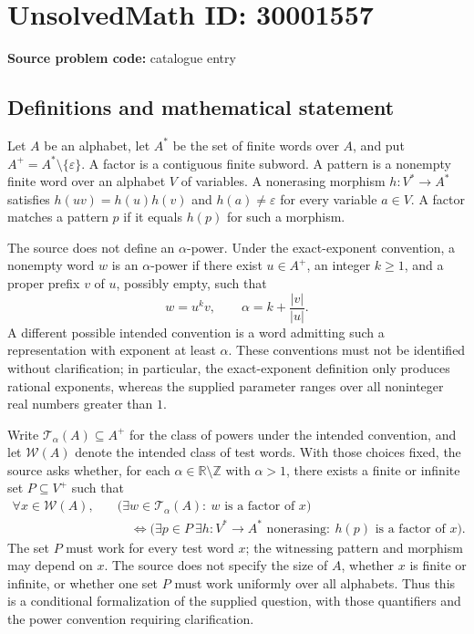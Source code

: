 \documentclass[11pt]{article}
\newcommand{\Z}{\mathbb{Z}}
\newcommand{\R}{\mathbb{R}}
\begin{document}
\section*{UnsolvedMath ID: 30001557}
\textbf{Source problem code:} catalogue entry
\subsection{Definitions and mathematical statement}
Let \(A\) be an alphabet, let \(A^*\) be the set of finite words over \(A\), and put \(A^+=A^*\setminus\{\varepsilon\}\). A factor is a contiguous finite subword. A pattern is a nonempty finite word over an alphabet \(V\) of variables. A nonerasing morphism \(h:V^*\to A^*\) satisfies \(h(uv)=h(u)h(v)\) and \(h(a)\ne\varepsilon\) for every variable \(a\in V\). A factor matches a pattern \(p\) if it equals \(h(p)\) for such a morphism.

The source does not define an \(\alpha\)-power. Under the exact-exponent convention, a nonempty word \(w\) is an \(\alpha\)-power if there exist \(u\in A^+\), an integer \(k\geq 1\), and a proper prefix \(v\) of \(u\), possibly empty, such that
\[
w=u^k v,\qquad \alpha=k+\frac{|v|}{|u|}.
\]
A different possible intended convention is a word admitting such a representation with exponent at least \(\alpha\). These conventions must not be identified without clarification; in particular, the exact-exponent definition only produces rational exponents, whereas the supplied parameter ranges over all noninteger real numbers greater than \(1\).

Write \(\mathcal T_\alpha(A)\subseteq A^+\) for the class of powers under the intended convention, and let \(\mathcal W(A)\) denote the intended class of test words. With those choices fixed, the source asks whether, for each \(\alpha\in\R\setminus\Z\) with \(\alpha>1\), there exists a finite or infinite set \(P\subseteq V^+\) such that
\[
\begin{aligned}
\forall x\in\mathcal W(A),\quad
&\bigl(\exists w\in\mathcal T_\alpha(A):\ w\text{ is a factor of }x\bigr)\\
&\quad\Longleftrightarrow
\bigl(\exists p\in P\ \exists h:V^*\to A^*\text{ nonerasing}:\ h(p)\text{ is a factor of }x\bigr).
\end{aligned}
\]
The set \(P\) must work for every test word \(x\); the witnessing pattern and morphism may depend on \(x\). The source does not specify the size of \(A\), whether \(x\) is finite or infinite, or whether one set \(P\) must work uniformly over all alphabets. Thus this is a conditional formalization of the supplied question, with those quantifiers and the power convention requiring clarification.
\end{document}
